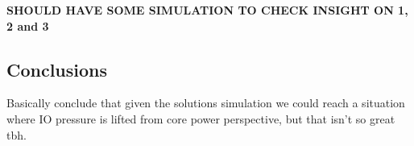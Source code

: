 \documentclass[letterpaper,twocolumn,10pt]{article}
\begin{document}
\textbf{SHOULD HAVE SOME SIMULATION TO CHECK INSIGHT ON 1, 2 and 3}\\

\subsection{Conclusions}

Basically conclude that given the solutions simulation we could reach a situation where IO pressure is lifted from core power perspective, but that isn't so great tbh. 
  


{\footnotesize 
}


\theendnotes
\end{document}

